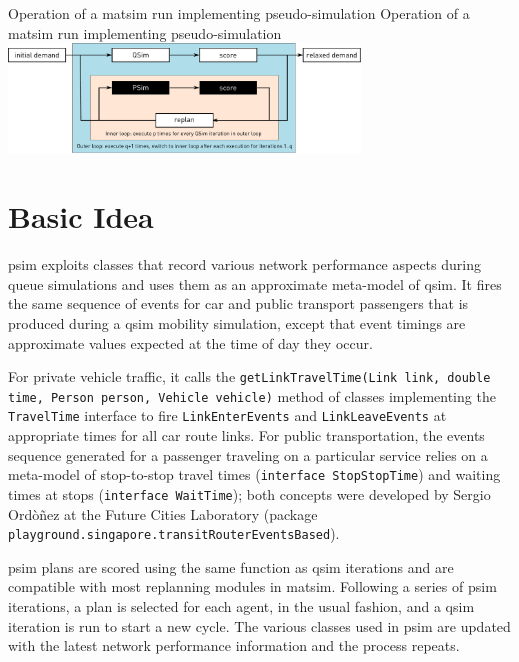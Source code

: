 \createfigure%
{Operation of a \protect\gls{matsim} run implementing pseudo-simulation}%
{Operation of a \protect\gls{matsim} run implementing pseudo-simulation}%
{\label{fig:PSim}}%
{\includegraphics[width=0.7\textwidth, angle=0]{extending/figures/PSim/psim.pdf}}%
{}

\section{Basic Idea}
\gls{psim} exploits classes that record various network performance aspects during queue simulations and uses them as an approximate meta-model of \gls{qsim}. It fires the same sequence of events for car and public transport passengers that is produced during a \gls{qsim} mobility simulation, except that event timings are approximate values expected at the time of day they occur.

For private vehicle traffic, it calls the \lstinline|getLinkTravelTime(Link link, double time, Person person, Vehicle vehicle)| method of classes implementing the \lstinline|TravelTime| interface to fire \lstinline|LinkEnterEvents| and \lstinline|LinkLeaveEvents| at appropriate times for all car route links. For public transportation, the events sequence generated for a passenger traveling on a particular service relies on a meta-model of stop-to-stop travel times (\lstinline|interface StopStopTime|) and waiting times at stops (\lstinline|interface WaitTime|); both concepts were developed by Sergio Ord\`o\~nez at the Future Cities Laboratory (package \lstinline|playground.singapore.transitRouterEventsBased|).

\gls{psim} plans are scored using the same function as  \gls{qsim} iterations and are compatible with most replanning modules in \gls{matsim}. Following a series of \gls{psim} iterations, a plan is selected for each agent, in the usual fashion, and a \gls{qsim} iteration is run to start a new cycle. The various classes used in \gls{psim} are updated with the latest network performance information and the process repeats.

